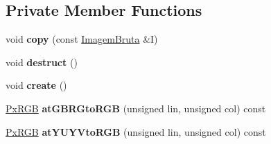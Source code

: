 \subsection*{Private Member Functions}
\begin{DoxyCompactItemize}
\item 
void {\bfseries copy} (const \hyperlink{classImagemBruta}{Imagem\+Bruta} \&I)\hypertarget{classImagemBruta_a6edc51fd214df869338574c331187f09}{}\label{classImagemBruta_a6edc51fd214df869338574c331187f09}

\item 
void {\bfseries destruct} ()\hypertarget{classImagemBruta_acb0f63b04d46186f72500c50dc4a1d2e}{}\label{classImagemBruta_acb0f63b04d46186f72500c50dc4a1d2e}

\item 
void {\bfseries create} ()\hypertarget{classImagemBruta_ae6451ca4e74e07a884543c6109aaa123}{}\label{classImagemBruta_ae6451ca4e74e07a884543c6109aaa123}

\item 
\hyperlink{classPxRGB}{Px\+R\+GB} {\bfseries at\+G\+B\+R\+Gto\+R\+GB} (unsigned lin, unsigned col) const \hypertarget{classImagemBruta_a75ab5b88fc886c7b0bcaf1290061341b}{}\label{classImagemBruta_a75ab5b88fc886c7b0bcaf1290061341b}

\item 
\hyperlink{classPxRGB}{Px\+R\+GB} {\bfseries at\+Y\+U\+Y\+Vto\+R\+GB} (unsigned lin, unsigned col) const \hypertarget{classImagemBruta_aaa16342431a936d8f9e5865ce4f67cf9}{}\label{classImagemBruta_aaa16342431a936d8f9e5865ce4f67cf9}

\end{DoxyCompactItemize}
